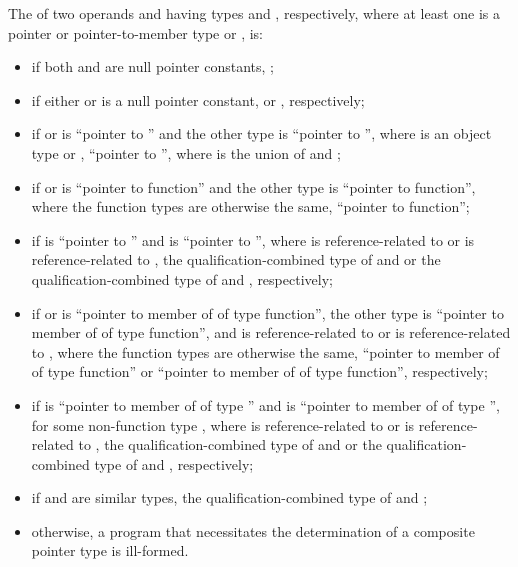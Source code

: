 \pnum
{}%
The  of
two operands  and
 having types  and , respectively, where at least one is a
pointer or pointer-to-member type or
, is:
\begin{itemize}
\item
if both  and  are null pointer constants,
;

\item
if either  or  is a null pointer constant,  or ,
respectively;

\item
if  or  is ``pointer to  '' and the
other type is ``pointer to  '',
where  is an object type or ,
``pointer to  '',
where  is the union of  and ;

\item
if  or  is ``pointer to  function'' and the
other type is ``pointer to function'', where the function types are otherwise the same,
``pointer to function'';

\item
if  is ``pointer to '' and  is ``pointer to
'', where  is reference-related to  or  is
reference-related to ,
the qualification-combined type
of  and  or the qualification-combined type of  and ,
respectively;

\item
if  or  is
``pointer to member of  of type function'',
the other type is
``pointer to member of  of type  function'', and
 is reference-related to  or
 is reference-related to ,
where the function types are otherwise the same,
``pointer to member of  of type function'' or
``pointer to member of  of type function'', respectively;

\item
if  is
``pointer to member of  of type  '' and
 is
``pointer to member of  of type  '',
for some non-function type ,
where  is
reference-related to  or  is reference-related to
, the qualification-combined type of  and  or the qualification-combined type
of  and , respectively;

\item
if  and  are similar types, the qualification-combined type of  and
;

\item
otherwise, a program that necessitates the determination of a
composite pointer type is ill-formed.
\end{itemize}


